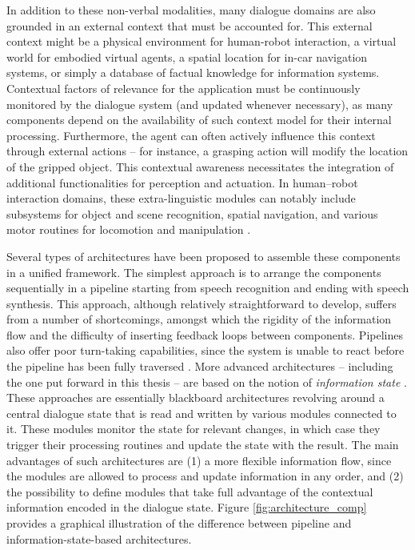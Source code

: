 In addition to these non-verbal modalities, many dialogue domains are also grounded in an external context that must be accounted for.  This external context might be a physical environment for human-robot interaction, a virtual world for embodied virtual agents, a spatial location for in-car navigation systems, or simply a database of factual knowledge for information systems. Contextual factors of relevance for the application must be continuously monitored by the dialogue system (and updated whenever necessary), as many components depend on the availability of such context model for their internal processing.  Furthermore, the agent can often actively influence this context through external actions -- for instance, a grasping action will modify the location of the gripped object.   This contextual awareness necessitates the integration of additional functionalities for perception and actuation. In human--robot interaction domains, these extra-linguistic modules can notably include subsystems for object and scene recognition, spatial navigation, and various motor routines for locomotion and manipulation  \citep{1570637,goodrich2007human,HawesSWZJKBBS07}. 

Several types of architectures have been proposed to assemble these components in a unified framework.  The simplest approach is to arrange the components sequentially in a pipeline starting from speech recognition and ending with speech synthesis.  This approach, although relatively straightforward to develop, suffers from a number of shortcomings, amongst which the rigidity of the information flow and the difficulty of inserting feedback loops between components. Pipelines also offer poor turn-taking capabilities, since the system is unable to react before the pipeline has been fully traversed \citep{RauxE09}. More advanced architectures -- including the one put forward in this thesis -- are based on the notion of \textit{information state} \citep{larsson2000information,Bos2003}.  These approaches are essentially blackboard architectures revolving around a central dialogue state that is read and written by various modules connected to it.  These modules monitor the state for relevant changes, in which case they trigger their processing routines and update the state with the result.  The main advantages of such architectures are (1) a more flexible information flow, since the modules are allowed to process and update information in any order, and (2) the possibility to define modules that take full advantage of the contextual information encoded in the dialogue state.  Figure \ref{fig:architecture_comp} provides a graphical illustration of the difference between pipeline and information-state-based architectures.  

